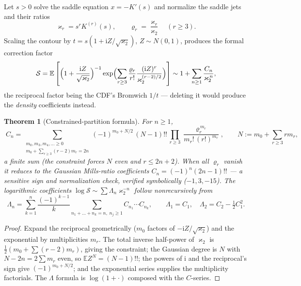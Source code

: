 \documentclass[11pt,oneside]{article}
\numberwithin{equation}{section}
\newtheorem{theorem}{Theorem}[section]
\theoremstyle{definition}
\theoremstyle{remark}
\newcommand{\E}{\mathbb E}
\newcommand{\ii}{\mathrm i}
\begin{document}
Let $s>0$ solve the saddle equation $x=-K'(s)$ and normalize the
saddle jets and their ratios
\begin{equation}
 \varkappa_r=s^{r}K^{(r)}(s),
 \qquad
 \varrho_r=\frac{\varkappa_r}{\varkappa_2}
 \quad(r\ge3).
 \label{eq:saddle-jets}
\end{equation}
Scaling the contour by $t=s(1+\ii Z/\sqrt{\varkappa_2})$,
$Z\sim N(0,1)$, produces the formal correction factor
\begin{equation}
 \mathcal S=\E\left[
 \Bigl(1+\frac{\ii Z}{\sqrt{\varkappa_2}}\Bigr)^{-1}
 \exp\Bigl(\sum_{r\ge3}\frac{\varrho_r}{r!}
 \frac{(\ii Z)^{r}}{\varkappa_2^{(r-2)/2}}\Bigr)
 \right]
 \sim1+\sum_{n\ge1}\frac{C_n}{\varkappa_2^{\,n}},
 \label{eq:S-def}
\end{equation}
the reciprocal factor being the CDF's Bromwich $1/t$ --- deleting it
would produce the \emph{density} coefficients instead.

\begin{theorem}[Constrained-partition formula]
\label{thm:Cn}
For $n\ge1$,
\begin{equation}
 \boxed{\;
 C_n=\sum_{\substack{m_0,m_3,m_4,\dots\ge0\\
 m_0+\sum_{r\ge3}(r-2)m_r=2n}}
 (-1)^{m_0+N/2}\,(N-1)!!\,
 \prod_{r\ge3}\frac{\varrho_r^{\,m_r}}{m_r!\,(r!)^{m_r}},
 \qquad
 N:=m_0+\sum_{r\ge3}rm_r,
 \;}
 \label{eq:Cn-partition}
\end{equation}
a finite sum (the constraint forces $N$ even and $r\le2n+2$).  When
all $\varrho_r$ vanish it reduces to the Gaussian Mills-ratio
coefficients $C_n=(-1)^{n}(2n-1)!!$ --- a sensitive sign and
normalization check, verified symbolically ($-1,3,-15$).  The
logarithmic coefficients
$\log\mathcal S\sim\sum\Lambda_n\varkappa_2^{-n}$ follow
nonrecursively from
\begin{equation}
 \Lambda_n=\sum_{k=1}^{n}\frac{(-1)^{k-1}}k
 \sum_{n_1+\dots+n_k=n,\;n_j\ge1}
 C_{n_1}\cdots C_{n_k},
 \qquad
 \Lambda_1=C_1,\quad
 \Lambda_2=C_2-\tfrac12C_1^{2}.
 \label{eq:Lambda}
\end{equation}
\end{theorem}

\begin{proof}
Expand the reciprocal geometrically ($m_0$ factors of
$-\ii Z/\sqrt{\varkappa_2}$) and the exponential by multiplicities
$m_r$.  The total inverse half-power of $\varkappa_2$ is
$\tfrac12(m_0+\sum(r-2)m_r)$, giving the constraint; the Gaussian
degree is $N$ with $N-2n=2\sum m_r$ even, so
$\E Z^{N}=(N-1)!!$; the powers of $\ii$ and the reciprocal's sign
give $(-1)^{m_0+N/2}$; and the exponential series supplies the
multiplicity factorials.  The $\Lambda$ formula is
$\log(1+\cdot)$ composed with the $C$-series.
\end{proof}
\end{document}
